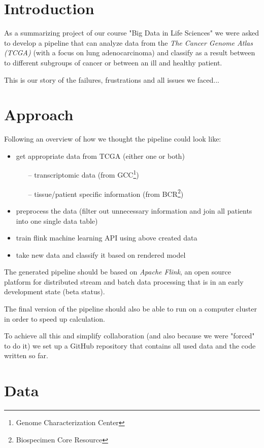 \documentclass{bioinfo}
\begin{document}
\section{Introduction}

As a summarizing project of our course "Big Data in Life Sciences" we were asked to develop a pipeline that can analyze data from the \emph{The Cancer Genome Atlas (TCGA)} (with a focus on lung adenocarcinoma) and classify as a result between to different subgroups of cancer or between an ill and healthy patient.

This is our story of the failures, frustrations and all issues we faced... 



\section{Approach}

Following an overview of how we thought the pipeline could look like:
\begin{itemize}
\item get appropriate data from TCGA (either one or both)
\begin{itemize}
\item[--] transcriptomic data (from GCC\footnote{Genome Characterization Center})
\item[--] tissue/patient specific information (from BCR\footnote{Biospecimen Core Resource})
\end{itemize}
\item preprocess the data (filter out unnecessary information and join all patients into one single data table)
\item train flink machine learning API using above created data
\item take new data and classify it based on rendered model
\end{itemize}
The generated pipeline should be based on \emph{Apache Flink}, an open source platform for distributed stream and batch data processing that is in an early development state (beta status).

The final version of the pipeline should also be able to run on a computer cluster in order to speed up calculation.

To achieve all this and simplify collaboration (and also because we were "forced" to do it) we set up a GitHub repository that contains all used data and the code written so far.


\section{Data}
\end{document}
